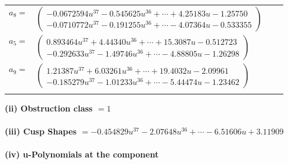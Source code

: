 \documentclass[1p]{elsarticle_modified}
\theoremstyle{definition}
\begin{document}
\begin{tabular}{m{7pt} m{180pt} m{7pt} m{180pt} }
\flushright $a_{8}=$&$\begin{pmatrix}-0.0672594 u^{37}-0.545625 u^{36}+\cdots+4.25183 u-1.25750\\-0.0710772 u^{37}-0.191255 u^{36}+\cdots-4.07364 u-0.533355\end{pmatrix}$ \\
\flushright $a_{5}=$&$\begin{pmatrix}0.893464 u^{37}+4.44340 u^{36}+\cdots+15.3087 u-0.512723\\-0.292633 u^{37}-1.49746 u^{36}+\cdots-4.88805 u-1.26298\end{pmatrix}$ \\
\flushright $a_{9}=$&$\begin{pmatrix}1.21387 u^{37}+6.03261 u^{36}+\cdots+19.4032 u-2.09961\\-0.185279 u^{37}-1.01233 u^{36}+\cdots-5.44474 u-1.23462\end{pmatrix}$\\&\end{tabular}
\flushleft \textbf{(ii) Obstruction class $= 1$}\\~\\
\flushleft \textbf{(iii) Cusp Shapes $= -0.454829 u^{37}-2.07648 u^{36}+\cdots-6.51606 u+3.11909$}\\~\\
\newpage\renewcommand{\arraystretch}{1}
\flushleft \textbf{(iv) u-Polynomials at the component}\newline \\
\end{document}
